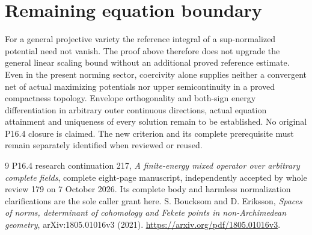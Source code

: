 \documentclass[11pt]{article}
\begin{document}
\section{Remaining equation boundary}

For a general projective variety the reference integral of a
sup-normalized potential need not vanish. The proof above therefore
does not upgrade the general linear scaling bound without an
additional proved reference estimate. Even in the present norming
sector, coercivity alone supplies neither a convergent net of
actual maximizing potentials nor upper semicontinuity in a proved
compactness topology. Envelope orthogonality and both-sign energy
differentiation in arbitrary outer continuous directions, actual
equation attainment and uniqueness of every solution remain to be
established. No original P16.4 closure is claimed. The new
criterion and its complete prerequisite must remain separately
identified when reviewed or reused.

\begin{thebibliography}{9}
 P16.4 research continuation 217,
\emph{A finite-energy mixed operator over arbitrary complete fields},
complete eight-page manuscript, independently accepted by whole
review 179 on 7 October 2026. Its complete body and harmless
normalization clarifications are the sole caller grant here.
 S. Boucksom and D. Eriksson,
\emph{Spaces of norms, determinant of cohomology and Fekete points in
non-Archimedean geometry}, arXiv:1805.01016v3 (2021).
\url{https://arxiv.org/pdf/1805.01016v3}.
\end{thebibliography}
\end{document}
